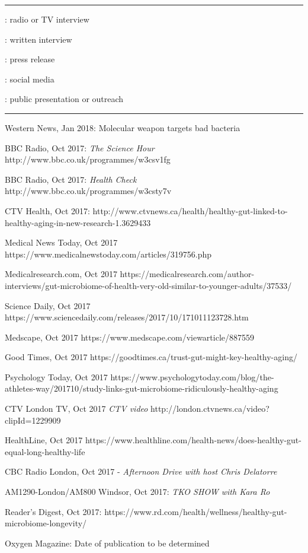 \documentclass[11pt]{article}
\begin{document}
\begin{description}
\vspace{0.25cm}\hrule
\item[I]: radio or TV interview
\item[W]: written interview
\item[P]: press release
\item[S]: social media
\item[R]: public presentation or outreach \hrule
\item[I] Western News, Jan 2018: Molecular weapon targets bad bacteria
\item[I] BBC Radio, Oct 2017: {\em The Science Hour} http://www.bbc.co.uk/programmes/w3csv1fg
\item[I] BBC Radio, Oct 2017: {\em Health Check} http://www.bbc.co.uk/programmes/w3csty7v
\item[I] CTV Health, Oct 2017: http://www.ctvnews.ca/health/healthy-gut-linked-to-healthy-aging-in-new-research-1.3629433
\item[W] Medical News Today, Oct 2017 https://www.medicalnewstoday.com/articles/319756.php
\item[W] Medicalresearch.com, Oct 2017 https://medicalresearch.com/author-interviews/gut-microbiome-of-health-very-old-similar-to-younger-adults/37533/
\item[P] Science Daily, Oct 2017 https://www.sciencedaily.com/releases/2017/10/171011123728.htm
\item[P] Medscape, Oct 2017 https://www.medscape.com/viewarticle/887559
\item[P] Good Times, Oct 2017 https://goodtimes.ca/trust-gut-might-key-healthy-aging/
\item[P] Psychology Today, Oct 2017 https://www.psychologytoday.com/blog/the-athletes-way/201710/study-links-gut-microbiome-ridiculously-healthy-aging
\item[I] CTV London TV, Oct 2017 {\em CTV video} http://london.ctvnews.ca/video?clipId=1229909
\item[I] HealthLine, Oct 2017 https://www.healthline.com/health-news/does-healthy-gut-equal-long-healthy-life
\item[I] CBC Radio London, Oct 2017 -  {\em Afternoon Drive with host Chris Delatorre}
\item[I] AM1290-London/AM800 Windsor, Oct 2017: {\em TKO SHOW with Kara Ro} 
\item[P] Reader’s Digest, Oct 2017: https://www.rd.com/health/wellness/healthy-gut-microbiome-longevity/
\item[W] Oxygen Magazine: Date of publication to be determined

\end{description}
\end{document}
